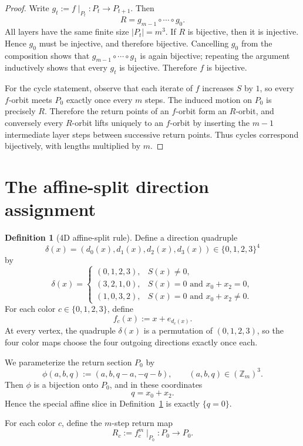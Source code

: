 \documentclass[11pt]{article}
\theoremstyle{definition}
\newtheorem{definition}[lemma]{Definition}
\theoremstyle{remark}
\newcommand{\Zm}{\mathbb Z_m}
\begin{document}
\begin{proof}
Write $g_t:=f\mid_{P_t}:P_t\to P_{t+1}$. Then
\[
R=g_{m-1}\circ\cdots\circ g_0.
\]
All layers have the same finite size $|P_t|=m^3$. If $R$ is bijective, then it is injective. Hence $g_0$ must be injective, and therefore bijective. Cancelling $g_0$ from the composition shows that $g_{m-1}\circ\cdots\circ g_1$ is again bijective; repeating the argument inductively shows that every $g_t$ is bijective. Therefore $f$ is bijective.

For the cycle statement, observe that each iterate of $f$ increases $S$ by $1$, so every $f$-orbit meets $P_0$ exactly once every $m$ steps. The induced motion on $P_0$ is precisely $R$. Therefore the return points of an $f$-orbit form an $R$-orbit, and conversely every $R$-orbit lifts uniquely to an $f$-orbit by inserting the $m-1$ intermediate layer steps between successive return points. Thus cycles correspond bijectively, with lengths multiplied by $m$.
\end{proof}

\section{The affine-split direction assignment}

\begin{definition}[4D affine-split rule]\label{def:affine-split}
Define a direction quadruple
\[
\delta(x)=(d_0(x),d_1(x),d_2(x),d_3(x))\in\{0,1,2,3\}^4
\]
by
\[
\delta(x)=
\begin{cases}
(0,1,2,3), & S(x)\neq 0,\\[1mm]
(3,2,1,0), & S(x)=0 \text{ and } x_0+x_2=0,\\[1mm]
(1,0,3,2), & S(x)=0 \text{ and } x_0+x_2\neq 0.
\end{cases}
\]
For each color $c\in\{0,1,2,3\}$, define
\[
f_c(x):=x+e_{d_c(x)}.
\]
At every vertex, the quadruple $\delta(x)$ is a permutation of $(0,1,2,3)$, so the four color maps choose the four outgoing directions exactly once each.
\end{definition}

We parameterize the return section $P_0$ by
\[
\phi(a,b,q):=(a,b,q-a,-q-b), \qquad (a,b,q)\in(\Zm)^3.
\]
Then $\phi$ is a bijection onto $P_0$, and in these coordinates
\[
q=x_0+x_2.
\]
Hence the special affine slice in Definition~\ref{def:affine-split} is exactly $\{q=0\}$.

For each color $c$, define the $m$-step return map
\[
R_c:=f_c^m\!\mid_{P_0}:P_0\to P_0.
\]
\end{document}
